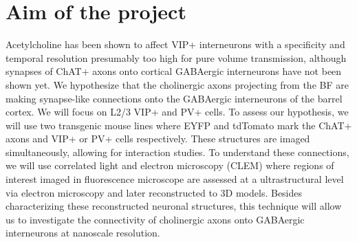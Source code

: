 \section{Aim of the project}
\label{sec:aim}
Acetylcholine has been shown to affect VIP+ interneurons with a specificity and temporal resolution presumably too high for pure volume transmission, although synapses of ChAT+ axons onto cortical GABAergic interneurons have not been shown yet.
We hypothesize that the cholinergic axons projecting from the BF are making synapse-like connections onto the GABAergic interneurons of the barrel cortex. We will focus on L2/3 VIP+ and PV+ cells. To assess our hypothesis, we will use two transgenic mouse lines where EYFP and tdTomato mark the ChAT+ axons and VIP+ or PV+ cells respectively. These structures are imaged simultaneously, allowing for interaction studies. To understand these connections, we will use correlated light and electron microscopy (CLEM) where regions of interest imaged in fluorescence microscope are assessed at a ultrastructural level via electron microscopy and later reconstructed to 3D models. Besides characterizing these reconstructed neuronal structures, this technique will allow us to investigate the connectivity of cholinergic axons onto GABAergic interneurons at nanoscale resolution.